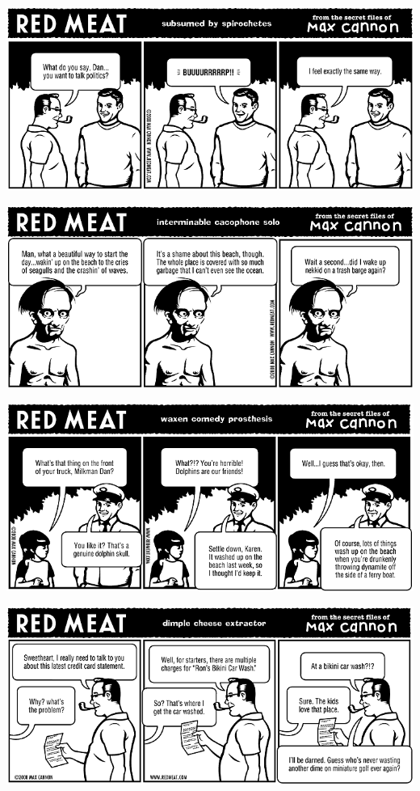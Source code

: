 \documentclass[a4paper,twoside,11pt]{article}
\begin{document}
\includegraphics[width=\textwidth]{redmeat_2008-01-15.png}



\includegraphics[width=\textwidth]{redmeat_2008-01-22.png}



\includegraphics[width=\textwidth]{redmeat_2008-01-29.png}



\includegraphics[width=\textwidth]{redmeat_2008-02-05.png}
\end{document}
